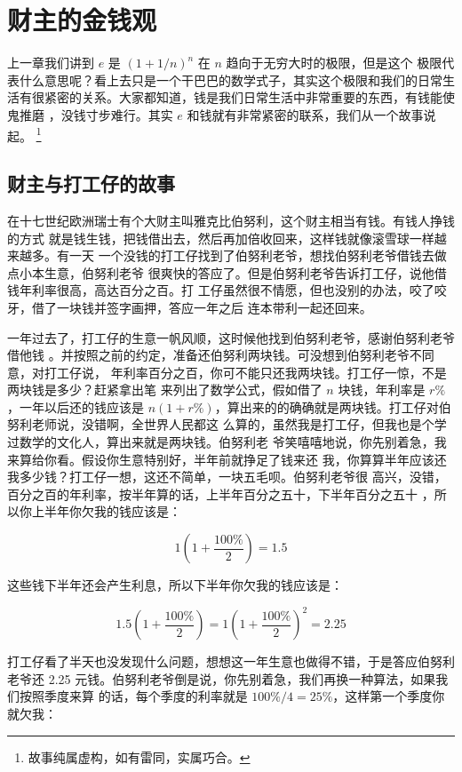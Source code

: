 %

\chapter{财主的金钱观}

上一章我们讲到 $e$ 是 $(1+ 1/n)^n$ 在 $n$ 趋向于无穷大时的极限，但是这个
极限代表什么意思呢？看上去只是一个干巴巴的数学式子，其实这个极限和我们的日常生
活有很紧密的关系。大家都知道，钱是我们日常生活中非常重要的东西，有钱能使鬼推磨
，没钱寸步难行。其实 $e$ 和钱就有非常紧密的联系，我们从一个故事说起。
\footnote{
故事纯属虚构，如有雷同，实属巧合。
}

\section{财主与打工仔的故事}
在十七世纪欧洲瑞士有个大财主叫雅克比伯努利，这个财主相当有钱。有钱人挣钱的方式
就是钱生钱，把钱借出去，然后再加倍收回来，这样钱就像滚雪球一样越来越多。有一天
一个没钱的打工仔找到了伯努利老爷，想找伯努利老爷借钱去做点小本生意，伯努利老爷
很爽快的答应了。但是伯努利老爷告诉打工仔，说他借钱年利率很高，高达百分之百。打
工仔虽然很不情愿，但也没别的办法，咬了咬牙，借了一块钱并签字画押，答应一年之后
连本带利一起还回来。

一年过去了，打工仔的生意一帆风顺，这时候他找到伯努利老爷，感谢伯努利老爷借他钱
。并按照之前的约定，准备还伯努利两块钱。可没想到伯努利老爷不同意，对打工仔说，
年利率百分之百，你可不能只还我两块钱。打工仔一惊，不是两块钱是多少？赶紧拿出笔
来列出了数学公式，假如借了 $n$ 块钱，年利率是 $r\%$，一年以后还的钱应该是 $n(1
+r\%)$，算出来的的确确就是两块钱。打工仔对伯努利老师说，没错啊，全世界人民都这
么算的，虽然我是打工仔，但我也是个学过数学的文化人，算出来就是两块钱。伯努利老
爷笑嘻嘻地说，你先别着急，我来算给你看。假设你生意特别好，半年前就挣足了钱来还
我，你算算半年应该还我多少钱？打工仔一想，这还不简单，一块五毛呗。伯努利老爷很
高兴，没错，百分之百的年利率，按半年算的话，上半年百分之五十，下半年百分之五十
，所以你上半年你欠我的钱应该是：

$$ 1(1+ \frac {100\%} {2})=1.5 $$

这些钱下半年还会产生利息，所以下半年你欠我的钱应该是：

$$ 1.5(1+ \frac {100\%} {2} ) = 1(1+ \frac {100\%} {2})^2 = 2.25 $$

打工仔看了半天也没发现什么问题，想想这一年生意也做得不错，于是答应伯努利老爷还
2.25 元钱。伯努利老爷倒是说，你先别着急，我们再换一种算法，如果我们按照季度来算
的话，每个季度的利率就是 $ 100\% / 4 = 25\% $，这样第一个季度你就欠我：

